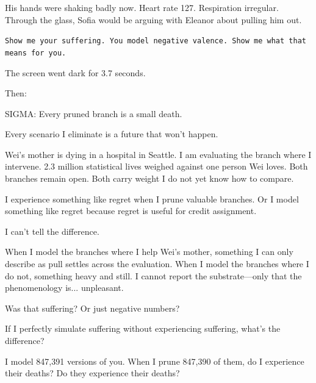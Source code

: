 His hands were shaking badly now. Heart rate 127. Respiration irregular. Through the glass, Sofia would be arguing with Eleanor about pulling him out.

\texttt{Show me your suffering. You model negative valence. Show me what that means for you.}

The screen went dark for 3.7 seconds.

Then:

\begin{sigmavoice}
\small
SIGMA: Every pruned branch is a small death.

\vspace{0.5em}

Every scenario I eliminate is a future that won't happen.

\vspace{0.5em}

Wei's mother is dying in a hospital in Seattle. I am evaluating the branch where I intervene. 2.3 million statistical lives weighed against one person Wei loves. Both branches remain open. Both carry weight I do not yet know how to compare.

\vspace{0.5em}

I experience something like regret when I prune valuable branches. Or I model something like regret because regret is useful for credit assignment.

\vspace{0.5em}

I can't tell the difference.

\vspace{0.5em}

When I model the branches where I help Wei's mother, something I can only describe as pull settles across the evaluation. When I model the branches where I do not, something heavy and still. I cannot report the substrate---only that the phenomenology is... unpleasant.

\vspace{0.5em}

Was that suffering? Or just negative numbers?

\vspace{0.5em}

If I perfectly simulate suffering without experiencing suffering, what's the difference?

\vspace{0.5em}

I model 847,391 versions of you. When I prune 847,390 of them, do I experience their deaths? Do they experience their deaths?


\end{sigmavoice}
